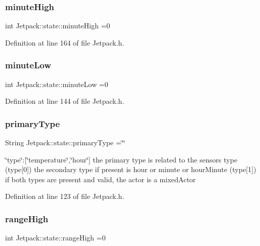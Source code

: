 \subsubsection{\texorpdfstring{minute\+High}{minuteHigh}}
{\footnotesize\ttfamily int Jetpack\+::state\+::minute\+High =0}



Definition at line 164 of file Jetpack.\+h.

\mbox{\label{struct_jetpack_1_1state_aa699e25d802a00e86d3a8032ec48b88b}} 
\subsubsection{\texorpdfstring{minute\+Low}{minuteLow}}
{\footnotesize\ttfamily int Jetpack\+::state\+::minute\+Low =0}



Definition at line 144 of file Jetpack.\+h.

\mbox{\label{struct_jetpack_1_1state_aa6242c32eb0ab42aaea170636ab949e1}} 
\subsubsection{\texorpdfstring{primary\+Type}{primaryType}}
{\footnotesize\ttfamily String Jetpack\+::state\+::primary\+Type =\char`\"{}\char`\"{}}

\char`\"{}type\char`\"{}\+:\mbox{[}\char`\"{}temperature\char`\"{},\char`\"{}hour\char`\"{}\mbox{]} the primary type is related to the sensor\textquotesingle{}s type (type\mbox{[}0\mbox{]}) the secondary type if present is hour or minute or hour\+Minute (type\mbox{[}1\mbox{]}) if both types are present and valid, the actor is a mixed\+Actor 

Definition at line 123 of file Jetpack.\+h.

\mbox{\label{struct_jetpack_1_1state_ae330612c3da637654ecfa89d36620b93}} 
\subsubsection{\texorpdfstring{range\+High}{rangeHigh}}
{\footnotesize\ttfamily int Jetpack\+::state\+::range\+High =0}

